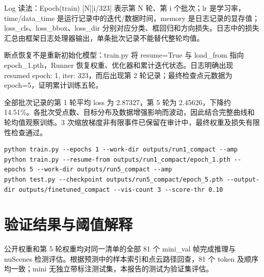 \documentclass[UTF8,zihao=-4,fontset=windows]{ctexart}
\begin{document}
Log 读法：Epoch(train) [N][i/\allowbreak{}323] 表示第 N 轮、第 i 个批次；lr 是学习率，time/\allowbreak{}data\_time 是运行记录中的迭代/\allowbreak{}数据时间，memory 是日志记录的显存值；loss\_cls、loss\_bbox、loss\_dir 分别对应分类、框回归和方向损失。日志中的损失汇总由框架日志处理器输出，单条批次记录不能替代整轮均值。


断点恢复不是重新初始化模型：train.py 将 resume=True 与 load\_from 指向 epoch\_1.pth，Runner 恢复权重、优化器和累计迭代状态。日志明确出现 resumed epoch: 1, iter: 323，而后出现第 2 轮记录；最终检查点元数据为 epoch=5，证明累计训练五轮。


全部批次记录的第 1 轮平均 loss 为 2.87327，第 5 轮为 2.45626，下降约 14.51\%。各批次受点数、目标分布及数据增强影响而波动，因此结合完整曲线和轮均值观察训练。3 次缩放梯度非有限事件已保留在审计中，最终权重及损失有限性检查通过。


\begin{lstlisting}[caption={实际训练、断点续训与最终验证命令。}]
python train.py --epochs 1 --work-dir outputs/run1_compact --amp
python train.py --resume-from outputs/run1_compact/epoch_1.pth --epochs 5 --work-dir outputs/run5_compact --amp
python test.py --checkpoint outputs/run5_compact/epoch_5.pth --output-dir outputs/finetuned_compact --vis-count 3 --score-thr 0.10
\end{lstlisting}


\FloatBarrier

\section{验证结果与阈值解释}

公开权重和第 5 轮权重均对同一清单的全部 81 个 mini\_val 帧完成推理与 nuScenes 检测评估。根据预测中的样本索引和点云路径回查，81 个 token 及顺序均一致；mini 无独立带标注测试集，本报告的测试为验证集评估。
\end{document}
